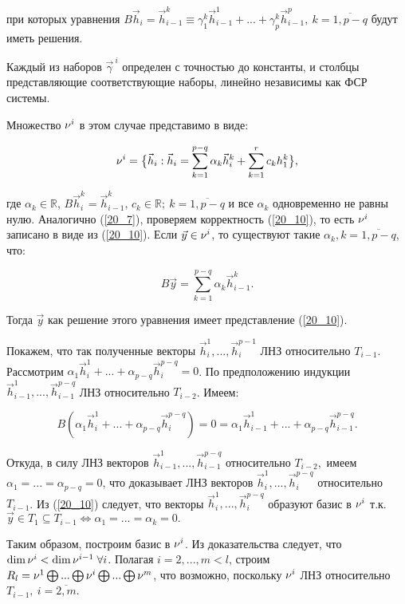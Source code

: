 при которых уравнения $B\vec{h}_i = \vec{h}_{i-1}^k \equiv \gamma_1^k \vec{h}_{i-1}^1 + ... + \gamma_p^k \vec{h}_{i-1}^p, \: k = \overline{1, p-q}$ будут иметь решения.

Каждый из наборов $\vec{\gamma}^{\: i}$ определен с точностью до константы, и столбцы представляющие соответствующие наборы, линейно независимы как ФСР системы.

Множество $\nu^i$ в этом случае представимо в виде:

\begin{equation}\label{20_10}
	\nu^i = \big\lbrace \vec{h}_i: \vec{h}_i = \sum\limits_{k=1}^{p-q}\alpha_k \vec{h}_i^k + \sum\limits_{k=1}^r c_k h_1^k \big\rbrace,
\end{equation}

где $\alpha_k \in  \mathbb{R}$, $B \vec{h}_i^k = \vec{h}_{i-1}^k$, $c_k \in \mathbb{R}; \: k = \overline{1, p-q}$ и все $\alpha_k$ одновременно не равны нулю. Аналогично (\ref{20_7}), проверяем корректность (\ref{20_10}), то есть $\nu^i$ записано в виде из (\ref{20_10}). Если $\vec{y} \in \nu^i$, то существуют такие $\alpha_k, k = \overline{1, p-q}$, что:

\[B \vec{y} = \sum\limits_{k=1}^{p-q} \alpha_k \vec{h}_{i-1}^k.\]

Тогда $\vec{y}$ как решение этого уравнения имеет представление (\ref{20_10}).

Покажем, что так полученные векторы $\vec{h}_i^1, ... , \vec{h}_i^{p-1}$ ЛНЗ относительно $T_{i-1}$. Рассмотрим $\alpha_1 \vec{h}_i^1 + ... + \alpha_{p-q} \vec{h}_i^{p-q} = 0$. По предположению индукции $\vec{h}_{i-1}^1, ... , \vec{h}_{i-1}^{p-q}$ ЛНЗ относительно $T_{i-2}$. Имеем:

\[B(\alpha_1 \vec{h}_i^1 + ... + \alpha_{p-q}\vec{h}_i^{p-q}) = 0 = \alpha_1 \vec{h}_{i-1}^1 + ... + \alpha_{p-q} \vec{h}_{i-1}^{p-q}.\]

Откуда, в силу ЛНЗ векторов $\vec{h}_{i-1}^1, ... ,\vec{h}_{i-1}^{p-q}$ относительно $T_{i-2},$ имеем $\alpha_1 = ... = \alpha_{p-q} = 0$, что доказывает ЛНЗ векторов $\vec{h}_i^1, ... , \vec{h}_i^{p-q}$ относительно $T_{i-1}$. Из (\ref{20_10}) следует, что векторы $\vec{h}_i^1, ... , \vec{h}_i^{p-q}$ образуют базис в $\nu^i$ т.к. $\vec{y} \in T_1\subseteq T_{i-1} \Leftrightarrow \alpha_1 = ... = \alpha_k = 0.$

Таким образом, построим базис в $\nu^i$. Из доказательства следует, что $\dim \nu^i < \dim \nu^{i-1} \; \forall i$. Полагая $i = 2, ... , m < l$, строим $R_l = \nu^1 \bigoplus ... \bigoplus \nu^i \bigoplus ... \bigoplus \nu^m$, что возможно, поскольку $\nu^i$ ЛНЗ относительно $T_{i-1}, \: i = \overline{2, m}$.
